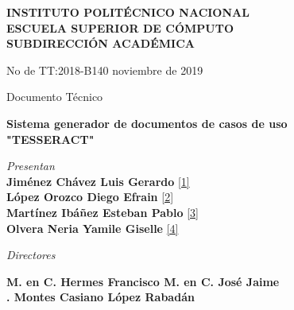 \documentclass[12pt]{report}
\begin{document}
\newpage
\begin{center}
\begin{large}
	\textbf {INSTITUTO POLITÉCNICO NACIONAL}\\
	\textbf {ESCUELA SUPERIOR DE CÓMPUTO}\\
	\textbf {SUBDIRECCIÓN ACADÉMICA}\\
\end{large}
\end{center}
\vspace*{0.4in}
\begin{normalsize}
	No de TT:2018-B140 \hspace{10.5cm} noviembre de 2019
\end{normalsize}

\begin{center}
	\begin{normalsize}
		Documento Técnico\\
	\end{normalsize}
	\vspace*{0.2in}	
	\begin{large}
		\textbf {Sistema generador de documentos de casos de uso\\
			"TESSERACT"}\\
	\end{large}
	\vspace*{0.5in}
	\begin{large}	
		\textit {Presentan}\\
		\textbf {Jiménez Chávez Luis Gerardo} \hyperlink{x01}{[1]}\\
		\textbf {López Orozco Diego Efrain} \hyperlink{x02}{[2]}\\
		\textbf {Martínez Ibáñez Esteban Pablo} \hyperlink{x03}{[3]}\\
		\textbf {Olvera Neria Yamile Giselle} \hyperlink{x04}{[4]}\\
	\end{large}
	\vspace*{0.4in}
	\begin{large}	
		\textit {Directores}\\
	\end{large}
	
	\begin{normalsize}
		\textbf {M. en C. Hermes Francisco \hspace{1.5cm} M. en C. José Jaime\\
			.\hspace{0.6cm} Montes Casiano \hspace{2.8cm} López Rabadán }
	\end{normalsize}
	\vspace*{0.4in}
	

\end{center}
\end{document}
